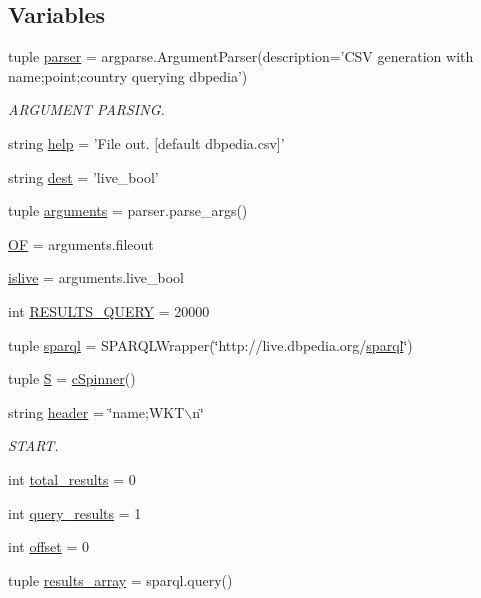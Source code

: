 \subsection*{\-Variables}
\begin{DoxyCompactItemize}
\item 
tuple \hyperlink{namespacealldbpediapoints_adf8df4e9e7647db7138cbc856f138d08}{parser} = argparse.\-Argument\-Parser(description='\-C\-S\-V generation with name;point;country querying dbpedia')
\begin{DoxyCompactList}\small\item\em \-A\-R\-G\-U\-M\-E\-N\-T \-P\-A\-R\-S\-I\-N\-G. \end{DoxyCompactList}\item 
string \hyperlink{namespacealldbpediapoints_ab3aabe434bef7bdc96533eb4b05d5eae}{help} = '\-File out. \mbox{[}default dbpedia.\-csv\mbox{]}'
\item 
string \hyperlink{namespacealldbpediapoints_a0739afb70aa3bc6f6a1e4ae7b9c876ee}{dest} = 'live\-\_\-bool'
\item 
tuple \hyperlink{namespacealldbpediapoints_a6550dc5d8362b16ccb483fa5e9b76c53}{arguments} = parser.\-parse\-\_\-args()
\item 
\hyperlink{namespacealldbpediapoints_ab8a03fffea8583884638a93339ff4523}{\-O\-F} = arguments.\-fileout
\item 
\hyperlink{namespacealldbpediapoints_a4222234d924a677b768a452ce5dea7e1}{islive} = arguments.\-live\-\_\-bool
\item 
int \hyperlink{namespacealldbpediapoints_aa84c23bff204551129efc030239a1d30}{\-R\-E\-S\-U\-L\-T\-S\-\_\-\-Q\-U\-E\-R\-Y} = 20000
\item 
tuple \hyperlink{namespacealldbpediapoints_a7a4fa8530ce9061fe014924a1676e73d}{sparql} = \-S\-P\-A\-R\-Q\-L\-Wrapper(\char`\"{}http\-://live.\-dbpedia.\-org/\hyperlink{namespacealldbpediapoints_a7a4fa8530ce9061fe014924a1676e73d}{sparql}\char`\"{})
\item 
tuple \hyperlink{namespacealldbpediapoints_ac1f9f39e29a7aedbcc64e9538f476a72}{\-S} = \hyperlink{classalldbpediapoints_1_1cSpinner}{c\-Spinner}()
\item 
string \hyperlink{namespacealldbpediapoints_a4b54f931c46b9fb9da599923641a2faf}{header} = \char`\"{}name;\-W\-K\-T$\backslash$n\char`\"{}
\begin{DoxyCompactList}\small\item\em \-S\-T\-A\-R\-T. \end{DoxyCompactList}\item 
int \hyperlink{namespacealldbpediapoints_ac0a3e9672828e3fea0d6d2aafa31b2da}{total\-\_\-results} = 0
\item 
int \hyperlink{namespacealldbpediapoints_a68f0d6010ae0d06cda635211083677a5}{query\-\_\-results} = 1
\item 
int \hyperlink{namespacealldbpediapoints_ab7c98613bae9215521f07b8219c81bcc}{offset} = 0
\item 
tuple \hyperlink{namespacealldbpediapoints_a806e39dd7996f0e6701f925654922fc9}{results\-\_\-array} = sparql.\-query()
\end{DoxyCompactItemize}


